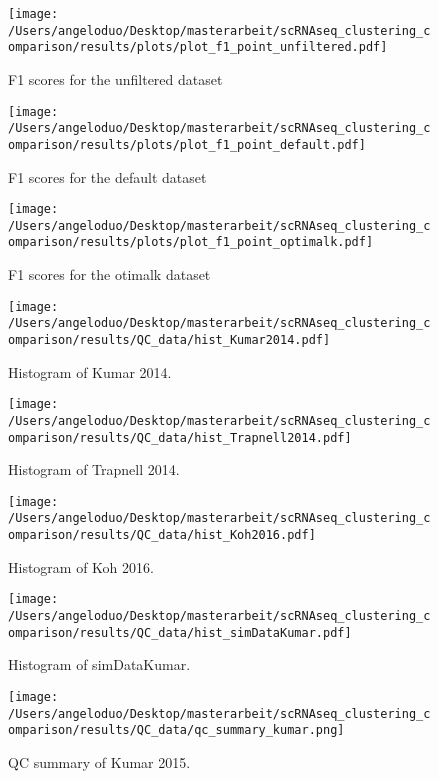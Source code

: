 \documentclass[12pt, a4paper]{article}\usepackage[]{graphicx}\usepackage[]{color}
\begin{document}
\begin{figure}[!h]
\texttt{[image: /Users/angeloduo/Desktop/masterarbeit/scRNAseq\_clustering\_comparison/results/plots/plot\_f1\_point\_unfiltered.pdf]}
\caption{F1 scores for the unfiltered  dataset }
\label{fig:f1pointunf}
\end{figure}

\begin{figure}[!h]
\texttt{[image: /Users/angeloduo/Desktop/masterarbeit/scRNAseq\_clustering\_comparison/results/plots/plot\_f1\_point\_default.pdf]}
\caption{F1 scores for the default  dataset }
\label{fig:f1poindef}
\end{figure}

\begin{figure}[!h]
\texttt{[image: /Users/angeloduo/Desktop/masterarbeit/scRNAseq\_clustering\_comparison/results/plots/plot\_f1\_point\_optimalk.pdf]}
\caption{F1 scores for the otimalk  dataset }
\label{fig:f1pointopt}
\end{figure}

\begin{figure}[!h]
\texttt{[image: /Users/angeloduo/Desktop/masterarbeit/scRNAseq\_clustering\_comparison/results/QC\_data/hist\_Kumar2014.pdf]}
\caption{Histogram of Kumar 2014.}
\label{fig:histkumar}
\end{figure}

\begin{figure}[!h]
\texttt{[image: /Users/angeloduo/Desktop/masterarbeit/scRNAseq\_clustering\_comparison/results/QC\_data/hist\_Trapnell2014.pdf]}
\caption{Histogram of Trapnell 2014. }
\label{fig:histtrap}
\end{figure}

\begin{figure}[!h]
\texttt{[image: /Users/angeloduo/Desktop/masterarbeit/scRNAseq\_clustering\_comparison/results/QC\_data/hist\_Koh2016.pdf]}
\caption{Histogram of Koh 2016. }
\label{fig:histkoh}
\end{figure}


\begin{figure}[!h]
\texttt{[image: /Users/angeloduo/Desktop/masterarbeit/scRNAseq\_clustering\_comparison/results/QC\_data/hist\_simDataKumar.pdf]}
\caption{Histogram of simDataKumar. }
\label{fig:histsim}
\end{figure}


\begin{figure}[!h]
\texttt{[image: /Users/angeloduo/Desktop/masterarbeit/scRNAseq\_clustering\_comparison/results/QC\_data/qc\_summary\_kumar.png]}
\caption{QC summary of Kumar 2015. }
\label{fig:qckumar}
\end{figure}
\end{document}
